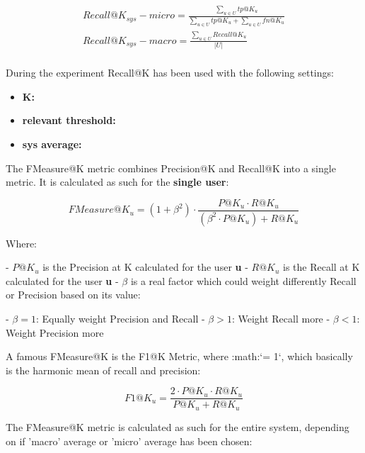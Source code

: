 \documentclass[11pt]{article}
\begin{document}
    \begin{gather*}
        Recall@K_{sys} - micro = \frac{\sum_{u \in U} tp@K_u}{\sum_{u \in U} tp@K_u + \sum_{u \in U} fn@K_u}\\
        Recall@K_{sys} - macro = \frac{\sum_{u \in U} Recall@K_u}{|U|}\\
    \end{gather*}

\hfill\break

During the experiment Recall@K has been used with the following settings:
\begin{itemize}
    \item \textbf{K:  }
    \item \textbf{relevant threshold:  }
    \item \textbf{sys average:  }
\end{itemize}


The FMeasure@K metric combines Precision@K and Recall@K into a single metric.
It is calculated as such for the \textbf{single user}:

    \[
    FMeasure@K_u = (1 + \beta^2) \cdot \frac{P@K_u \cdot R@K_u}{(\beta^2 \cdot P@K_u) + R@K_u}
    \]

    Where:

    - $P@K_u$ is the Precision at K calculated for the user \textbf{u}
    - $R@K_u$ is the Recall at K calculated for the user \textbf{u}
    - $\beta$ is a real factor which could weight differently Recall or Precision based on its value:

        - $\beta = 1$: Equally weight Precision and Recall
        - $\beta > 1$: Weight Recall more
        - $\beta < 1$: Weight Precision more

\hfill\break

A famous FMeasure@K is the F1@K Metric, where :math:`\beta = 1`, which basically is the harmonic mean of recall and
precision:

    \[
    F1@K_u = \frac{2 \cdot P@K_u \cdot R@K_u}{P@K_u + R@K_u}
    \]

\hfill\break

The FMeasure@K metric is calculated as such for the entire system, depending on if 'macro' average or 'micro'
average has been chosen:
\end{document}
